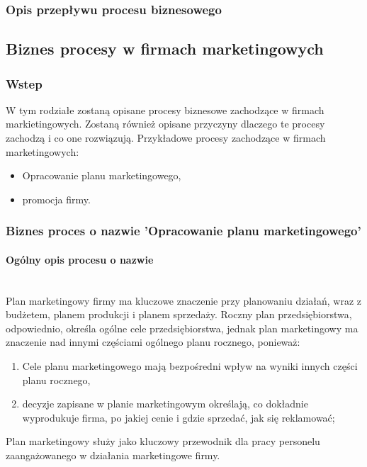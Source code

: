 \documentclass[a4paper, 12pt]{article}
\begin{document}
\subsubsection{Opis przepływu procesu biznesowego}

\subsection{Biznes procesy w firmach marketingowych}
\subsubsection{Wstep}
\hspace*{1 cm} W tym rodziałe zostaną opisane procesy biznesowe zachodzące w firmach markietingowych. Zostaną również opisane przyczyny dlaczego te procesy zachodzą i co one rozwiązują. Przykładowe procesy zachodzące w firmach marketingowych:
\begin{itemize}
	\item Opracowanie planu marketingowego,
	\item promocja firmy.
\end{itemize}
\subsubsection{Biznes proces o nazwie 'Opracowanie planu marketingowego'}
\paragraph{Ogólny opis procesu o nazwie}\mbox{}\\
\hspace*{1 cm}Plan marketingowy firmy ma kluczowe znaczenie przy planowaniu działań, wraz z budżetem, planem produkcji i planem sprzedaży. Roczny plan przedsiębiorstwa, odpowiednio, określa ogólne cele przedsiębiorstwa, jednak plan marketingowy ma znaczenie nad innymi częściami ogólnego planu rocznego, ponieważ:
\begin{enumerate}
	\item Cele planu marketingowego mają bezpośredni wpływ na wyniki innych części planu rocznego,
	\item decyzje zapisane w planie marketingowym określają, co dokładnie wyprodukuje firma, po jakiej cenie i gdzie sprzedać, jak się reklamować;
\end{enumerate}
\hspace*{1 cm}Plan marketingowy służy jako kluczowy przewodnik dla pracy personelu zaangażowanego w działania marketingowe firmy.
\end{document}
